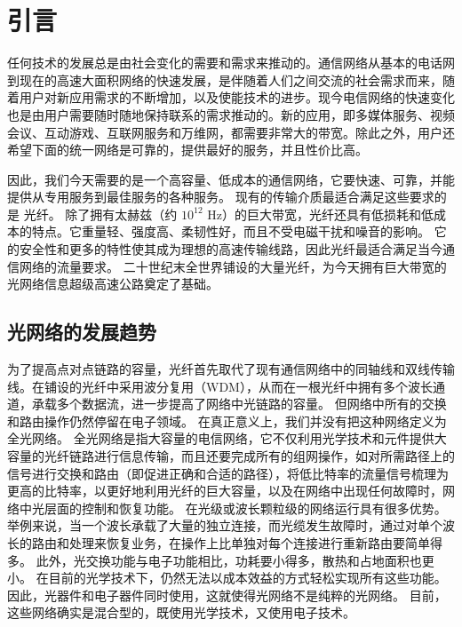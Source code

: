 \documentclass[degree=project,degree-type=project,cjk-font=noto]{thuthesis}
\begin{document}
\maketitle

\frontmatter
% 

\tableofcontents

\mainmatter

\chapter{引言}

任何技术的发展总是由社会变化的需要和需求来推动的。通信网络从基本的电话网到现在的高速大面积网络的快速发展，是伴随着人们之间交流的社会需求而来，随着用户对新应用需求的不断增加，以及使能技术的进步。现今电信网络的快速变化也是由用户需要随时随地保持联系的需求推动的。新的应用，即多媒体服务、视频会议、互动游戏、互联网服务和万维网，都需要非常大的带宽。除此之外，用户还希望下面的统一网络是可靠的，提供最好的服务，并且性价比高。

因此，我们今天需要的是一个高容量、低成本的通信网络，它要快速、可靠，并能提供从专用服务到最佳服务的各种服务。
现有的传输介质最适合满足这些要求的是 {\heiti 光纤}。
除了拥有太赫兹（约 $10^{12}$ Hz）的巨大带宽，光纤还具有低损耗和低成本的特点。它重量轻、强度高、柔韧性好，而且不受电磁干扰和噪音的影响。 它的安全性和更多的特性使其成为理想的高速传输线路，因此光纤最适合满足当今通信网络的流量要求。 二十世纪末全世界铺设的大量光纤，为今天拥有巨大带宽的光网络信息超级高速公路奠定了基础。

\section{光网络的发展趋势}

为了提高点对点链路的容量，光纤首先取代了现有通信网络中的同轴线和双线传输线。在铺设的光纤中采用波分复用（WDM），从而在一根光纤中拥有多个波长通道，承载多个数据流，进一步提高了网络中光链路的容量。 但网络中所有的交换和路由操作仍然停留在电子领域。 在真正意义上，我们并没有把这种网络定义为全光网络。 全光网络是指大容量的电信网络，它不仅利用光学技术和元件提供大容量的光纤链路进行信息传输，而且还要完成所有的组网操作，如对所需路径上的信号进行交换和路由（即促进正确和合适的路径），将低比特率的流量信号梳理为更高的比特率，以更好地利用光纤的巨大容量，以及在网络中出现任何故障时，网络中光层面的控制和恢复功能。 在光级或波长颗粒级的网络运行具有很多优势。举例来说，当一个波长承载了大量的独立连接，而光缆发生故障时，通过对单个波长的路由和处理来恢复业务，在操作上比单独对每个连接进行重新路由要简单得多。 此外，光交换功能与电子功能相比，功耗要小得多，散热和占地面积也更小。 在目前的光学技术下，仍然无法以成本效益的方式轻松实现所有这些功能。因此，光器件和电子器件同时使用，这就使得光网络不是纯粹的光网络。 目前，这些网络确实是混合型的，既使用光学技术，又使用电子技术。
\end{document}
